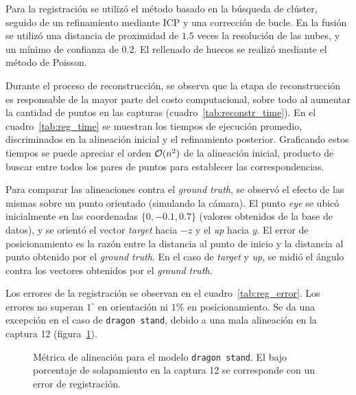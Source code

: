 		Para la registración se utilizó el método basado en la búsqueda de clúster,
		seguido de un refinamiento mediante ICP y una corrección de bucle.
		En la fusión se utilizó una distancia de proximidad de $1.5$ veces la resolución de las nubes,
		y un mínimo de confianza de $0.2$.
		El rellenado de huecos se realizó mediante el método de Poisson.


		Durante el proceso de reconstrucción, se observa que la etapa de reconstrucción
		es responsable de la mayor parte del costo computacional, sobre todo al aumentar
		la cantidad de puntos en las capturas (cuadro~\ref{tab:reconstr_time}).
		En el cuadro~\ref{tab:reg_time} se muestran
		los tiempos de ejecución promedio, discriminados en la alineación
		inicial y el refinamiento posterior.
		Graficando estos tiempos se puede apreciar el orden $\mathcal{O}(n^2)$ de la alineación inicial,
		producto de buscar entre todos los pares de puntos para establecer las correspondencias.
		

		

		Para comparar las alineaciones contra el \emph{ground truth}, se
		observó el efecto de las mismas sobre un punto orientado (simulando la
		cámara). El punto \emph{eye} se ubicó inicialmente en las coordenadas
		$\{0, -0.1, 0.7\}$ (valores obtenidos de la base de datos), y se
		orientó el vector \emph{target} hacia $-z$ y el \emph{up} hacia $y$.
		El error de posicionamiento es la razón entre la distancia al punto
		de inicio y la distancia al punto obtenido por el \emph{ground truth}.
		En el caso de \emph{target} y \emph{up}, se midió el ángulo contra los
		vectores obtenidos por el \emph{ground truth}.

		Los errores de la registración se observan en el
		cuadro~\ref{tab:reg_error}.  Los errores no superan $1^{\circ}$ en
		orientación ni $1\%$ en posicionamiento.  Se da una excepción en el
		caso de \texttt{dragon stand}, debido a una mala alineación en la
		captura 12 (figura~\ref{fig:fitness}).

		

		\begin{figure}
			\centering
				\resizebox{\linewidth}{!}{}
			\caption{\label{fig:fitness}Métrica de alineación para el modelo \texttt{dragon stand}. El bajo
			porcentaje de solapamiento en la captura 12 se corresponde
			con un error de registración.}
		\end{figure}



